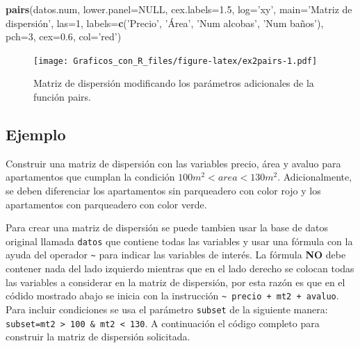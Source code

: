 \documentclass[10pt,]{krantz}
\makeatletter
\newenvironment{Shaded}{\begin{snugshade}}{\end{snugshade}}
\newcommand{\KeywordTok}[1]{\textcolor[rgb]{0.13,0.29,0.53}{\textbf{{#1}}}}
\newcommand{\DataTypeTok}[1]{\textcolor[rgb]{0.13,0.29,0.53}{{#1}}}
\newcommand{\DecValTok}[1]{\textcolor[rgb]{0.00,0.00,0.81}{{#1}}}
\newcommand{\FloatTok}[1]{\textcolor[rgb]{0.00,0.00,0.81}{{#1}}}
\newcommand{\StringTok}[1]{\textcolor[rgb]{0.31,0.60,0.02}{{#1}}}
\newcommand{\OtherTok}[1]{\textcolor[rgb]{0.56,0.35,0.01}{{#1}}}
\newcommand{\NormalTok}[1]{{#1}}
\newenvironment{kframe}{%
\medskip{}
\setlength{\fboxsep}{.8em}
 \def\at@end@of@kframe{}%
 \ifinner\ifhmode%
  \def\at@end@of@kframe{\end{minipage}}%
  \begin{minipage}{\columnwidth}%
 \fi\fi%
 \def\FrameCommand##1{\hskip\@totalleftmargin \hskip-\fboxsep
 \colorbox{shadecolor}{##1}\hskip-\fboxsep
     \hskip-\linewidth \hskip-\@totalleftmargin \hskip\columnwidth}%
 \MakeFramed {\advance\hsize-\width
   \@totalleftmargin\z@ \linewidth\hsize
   \@setminipage}}%
 {\par\unskip\endMakeFramed%
 \at@end@of@kframe}
\renewenvironment{Shaded}{\begin{kframe}}{\end{kframe}}
\makeatother
\begin{document}
\begin{Shaded}
\begin{Highlighting}[]
\KeywordTok{pairs}\NormalTok{(datos.num, }\DataTypeTok{lower.panel=}\OtherTok{NULL}\NormalTok{, }\DataTypeTok{cex.labels=}\FloatTok{1.5}\NormalTok{, }\DataTypeTok{log=}\StringTok{'xy'}\NormalTok{,}
      \DataTypeTok{main=}\StringTok{'Matriz de dispersión'}\NormalTok{, }\DataTypeTok{las=}\DecValTok{1}\NormalTok{,}
      \DataTypeTok{labels=}\KeywordTok{c}\NormalTok{(}\StringTok{'Precio'}\NormalTok{, }\StringTok{'Área'}\NormalTok{, }\StringTok{'Num alcobas'}\NormalTok{, }\StringTok{'Num baños'}\NormalTok{),}
      \DataTypeTok{pch=}\DecValTok{3}\NormalTok{, }\DataTypeTok{cex=}\FloatTok{0.6}\NormalTok{, }\DataTypeTok{col=}\StringTok{'red'}\NormalTok{)}
\end{Highlighting}
\end{Shaded}

\begin{figure}[htbp]
\centering
\texttt{[image: Graficos\_con\_R\_files/figure-latex/ex2pairs-1.pdf]}
\caption{\label{fig:ex2pairs}Matriz de dispersión modificando los parámetros
adicionales de la función pairs.}
\end{figure}

\subsection*{Ejemplo}\label{ejemplo-14}


Construir una matriz de dispersión con las variables precio, área y
avaluo para apartamentos que cumplan la condición
\(100 m^2 < area < 130 m^2\). Adicionalmente, se deben diferenciar los
apartamentos sin parqueadero con color rojo y los apartamentos con
parqueadero con color verde.

Para crear una matriz de dispersión se puede tambien usar la base de
datos original llamada \texttt{datos} que contiene todas las variables y
usar una fórmula con la ayuda del operador \texttt{\textasciitilde{}}
para indicar las variables de interés. La fórmula \textbf{NO} debe
contener nada del lado izquierdo mientras que en el lado derecho se
colocan todas las variables a considerar en la matriz de dispersión, por
esta razón es que en el códido mostrado abajo se inicia con la
instrucción \texttt{\textasciitilde{}\ precio\ +\ mt2\ +\ avaluo}. Para
incluir condiciones se usa el parámetro \texttt{subset} de la siguiente
manera:
\texttt{subset=mt2\ \textgreater{}\ 100\ \&\ mt2\ \textless{}\ 130}. A
continuación el código completo para construir la matriz de dispersión
solicitada.
\end{document}
